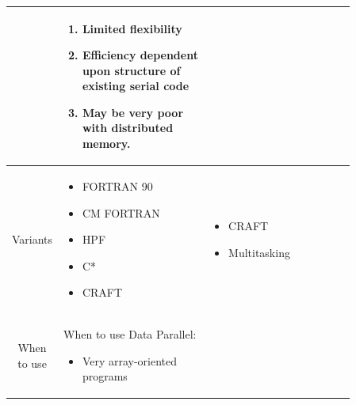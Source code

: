 \documentclass[12pt, a4paper]{book}
\begin{document}
\begin{longtable}{|c|p{0.43\linewidth}|p{0.43\linewidth}|}
\begin{enumerate}
                    \end{enumerate}                                                                & \begin{enumerate}
                                                                                                         \item Limited flexibility
                                                                                                         \item Efficiency dependent upon structure of existing serial code
                                                                                                         \item May be very poor with distributed memory.
                                                                                                     \end{enumerate}                                                        \\
    \hline
    Variants      & \begin{itemize}
                        \item FORTRAN 90
                        \item CM FORTRAN
                        \item HPF
                        \item   C*
                        \item CRAFT
                    \end{itemize}                                                                                 & \begin{itemize}
                                                                                                                        \item CRAFT
                                                                                                                        \item Multitasking
                                                                                                                    \end{itemize}                                                                                        \\
    \hline
    When to use   & When to use Data Parallel: \begin{itemize}
                                                   \item Very array-oriented programs

\end{itemize}
\end{longtable}
\end{document}

